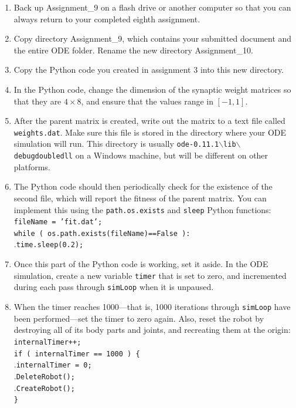 \documentclass[12pt]{article}
\begin{document}
\begin{enumerate}

\item Back up Assignment\_9 on a flash drive or another computer so that you can always return to your completed eighth assignment.

\item Copy directory Assignment\_9, which contains your submitted document and the entire ODE folder. Rename the new directory Assignment\_10.

\item Copy the Python code you created in assignment 3 into this new directory.

\item In the Python code, change the dimension of the synaptic weight matrices so that they are $4 \times 8$, and ensure that the values range in $[-1,1]$.

\item After the parent matrix is created, write out the matrix to a text file called \texttt{weights.dat}. Make sure this file is stored in the directory where your ODE simulation will run. This directory is usually \texttt{ode-0.11.1$\backslash$lib$\backslash$debugdoubledll} on a Windows machine, but will be different on other platforms.

\item The Python code should then periodically check for the existence of the second file, which will report the fitness of the parent matrix. You can implement this using the \texttt{path.os.exists} and \texttt{sleep} Python functions: \\
   \texttt{fileName = 'fit.dat';}\\
   \texttt{while ( os.path.exists(fileName)==False ):}\\
.\hspace{0.5cm}\texttt{\hspace{0.5cm}time.sleep(0.2);}\\

 \item Once this part of the Python code is working, set it aside. In the ODE simulation, create a new variable \texttt{timer} that is set to zero, and incremented during each pass through \texttt{simLoop} when it is unpaused.

 \item When the timer reaches 1000---that is, 1000 iterations through \texttt{simLoop} have been performed---set the timer to zero again. Also, reset the robot by destroying all of its body parts and joints, and recreating them at the origin: \\
   \texttt{internalTimer++;}\\
   \texttt{if ( internalTimer == 1000 ) \{}\\
.\hspace{0.5cm}\texttt{internalTimer = 0;}\\
.\hspace{0.5cm}\texttt{DeleteRobot();}\\
.\hspace{0.5cm}\texttt{CreateRobot();}\\
   \texttt{\}}\\


\end{enumerate}
\end{document}
